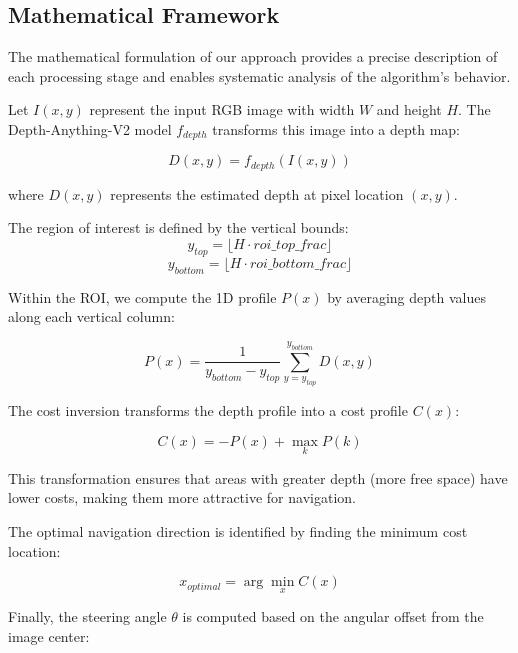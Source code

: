 \documentclass[conference]{IEEEtran}
\begin{document}
\subsection{Mathematical Framework}
The mathematical formulation of our approach provides a precise description of each processing stage and enables systematic analysis of the algorithm's behavior.

Let $I(x,y)$ represent the input RGB image with width $W$ and height $H$. The Depth-Anything-V2 model $f_{depth}$ transforms this image into a depth map:

\begin{equation}
D(x,y) = f_{depth}(I(x,y))
\end{equation}

where $D(x,y)$ represents the estimated depth at pixel location $(x,y)$.

The region of interest is defined by the vertical bounds:
\begin{equation}
y_{top} = \lfloor H \cdot roi\_top\_frac \rfloor
\end{equation}
\begin{equation}
y_{bottom} = \lfloor H \cdot roi\_bottom\_frac \rfloor
\end{equation}

Within the ROI, we compute the 1D profile $P(x)$ by averaging depth values along each vertical column:

\begin{equation}
P(x) = \frac{1}{y_{bottom} - y_{top}} \sum_{y=y_{top}}^{y_{bottom}} D(x,y)
\end{equation}

The cost inversion transforms the depth profile into a cost profile $C(x)$:

\begin{equation}
C(x) = -P(x) + \max_{k} P(k)
\end{equation}

This transformation ensures that areas with greater depth (more free space) have lower costs, making them more attractive for navigation.

The optimal navigation direction is identified by finding the minimum cost location:

\begin{equation}
x_{optimal} = \arg\min_{x} C(x)
\end{equation}

Finally, the steering angle $\theta$ is computed based on the angular offset from the image center:
\end{document}
